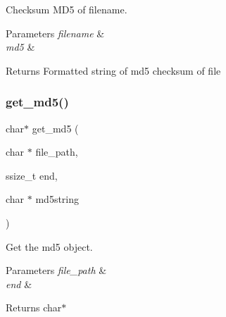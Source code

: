 Checksum M\+D5 of filename. 


\begin{DoxyParams}{Parameters}
{\em filename} & \\
\hline
{\em md5} & \\
\hline
\end{DoxyParams}
\begin{DoxyReturn}{Returns}
Formatted string of md5 checksum of file 
\end{DoxyReturn}
\mbox{\label{md5_8h_a882e1f1933e1504e1bb0832a7b226719}} 
\subsubsection{get\+\_\+md5()}
{\footnotesize\ttfamily char$\ast$ get\+\_\+md5 (\begin{DoxyParamCaption}\item[{char $\ast$}]{file\+\_\+path,  }\item[{ssize\+\_\+t}]{end,  }\item[{char $\ast$}]{md5string }\end{DoxyParamCaption})}



Get the md5 object. 


\begin{DoxyParams}{Parameters}
{\em file\+\_\+path} & \\
\hline
{\em end} & \\
\hline
\end{DoxyParams}
\begin{DoxyReturn}{Returns}
char$\ast$ 
\end{DoxyReturn}
